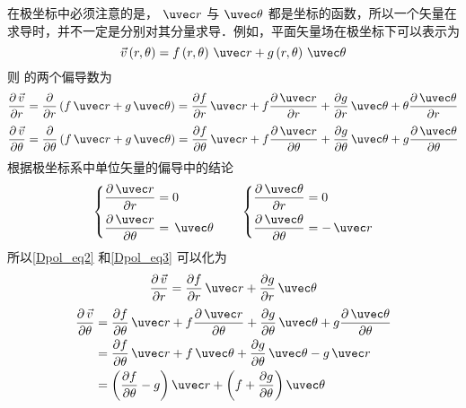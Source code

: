 在极坐标中必须注意的是， $\uvec r$ 与 $\uvec \theta $ 都是坐标的函数，所以一个矢量在求导时，并不一定是分别对其分量求导．例如，平面矢量场在极坐标下可以表示为
\begin{equation}\label{Dpol_eq1}
\vec v\left( {r,\theta } \right) = f\left( {r,\theta } \right)\,\uvec r + g\left( {r,\theta } \right)\,\uvec \theta 
\end{equation}
则 的两个偏导数为
\begin{equation}\label{Dpol_eq2}
\frac{{\partial \,\vec v}}{{\partial r}} = \frac{\partial }{{\partial r}}\left( {f\,\uvec r + g\,\uvec \theta } \right) = \frac{{\partial f}}{{\partial r}}\,\uvec r + f\frac{{\partial \,\uvec r}}{{\partial r}} + \frac{{\partial g}}{{\partial r}}\,\uvec \theta  + \theta \frac{{\partial \,\uvec \theta }}{{\partial r}}
\end{equation}
\begin{equation}\label{Dpol_eq3}
\frac{{\partial \,\vec v}}{{\partial \theta }} = \frac{\partial }{{\partial \theta }}\left( {f\,\uvec r + g\,\uvec \theta } \right) = \frac{{\partial f}}{{\partial \theta }}\,\uvec r + f\frac{{\partial \,\uvec r}}{{\partial \theta }} + \frac{{\partial g}}{{\partial \theta }}\,\uvec \theta  + g\frac{{\partial \,\uvec \theta }}{{\partial \theta }}
\end{equation}
根据极坐标系中单位矢量的偏导中的结论
\begin{equation}
\left\{ \begin{aligned}
\frac{{\partial \,\uvec r}}{{\partial r}} &= 0\\
\frac{{\partial \,\uvec r}}{{\partial \theta }} &= \,\uvec \theta 
\end{aligned} \right.
\qquad
\left\{ \begin{aligned}
\frac{{\partial \,\uvec \theta }}{{\partial r}} &= 0\\
\frac{{\partial \,\uvec \theta }}{{\partial \theta }} &=  - \,\uvec r
\end{aligned} \right.
\end{equation}
所以\autoref{Dpol_eq2} 和\autoref{Dpol_eq3} 可以化为
\begin{equation}
\frac{{\partial \,\vec v}}{{\partial r}} = \frac{{\partial f}}{{\partial r}}\,\uvec r + \frac{{\partial g}}{{\partial r}}\,\uvec \theta 
\end{equation}
\begin{equation}\begin{aligned}
\frac{{\partial \,\vec v}}{{\partial \theta }} &= \frac{{\partial f}}{{\partial \theta }}\,\uvec r + f\frac{{\partial \,\uvec r}}{{\partial \theta }} + \frac{{\partial g}}{{\partial \theta }}\,\uvec \theta  + g\frac{{\partial \,\uvec \theta }}{{\partial \theta }}\\
 &= \frac{{\partial f}}{{\partial \theta }}\,\uvec r + f\,\uvec \theta + \frac{{\partial g}}{{\partial \theta }}\,\uvec \theta  - g\,\uvec r\\
 &= \left( {\frac{{\partial f}}{{\partial \theta }} - g} \right)\uvec r + \left( {f + \frac{{\partial g}}{{\partial \theta }}} \right)\uvec \theta 
\end{aligned}\end{equation}
 

